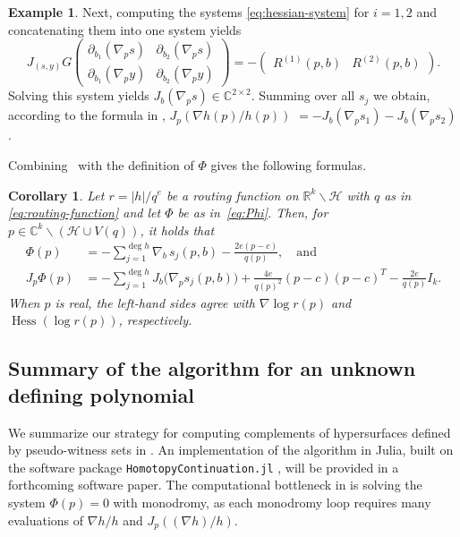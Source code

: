\documentclass[11pt]{article}
\numberwithin{equation}{section}
\theoremstyle{plain}
\newtheorem{corollary}[theorem]{Corollary}
\theoremstyle{definition}
\newtheorem{example}[theorem]{Example}
\theoremstyle{remark}
\newcommand{\sH}{{\mathcal H}}
\newcommand\bC{{\mathbb C}}
\newcommand\bR{{\mathbb R}}
\DeclareMathOperator*{\Hess}{Hess}
\begin{document}
\begin{example}
    Next, computing the systems \eqref{eq:hessian-system} for $i=1,2$ and concatenating them into one system yields
    \begin{equation*}
        J_{(s,y)}G
        \begin{pmatrix}
           \partial_{b_{1}}(\nabla_{p}s) & \partial_{b_{2}}(\nabla_{p}s)\\
           \partial_{b_{1}}(\nabla_{p}y) & \partial_{b_{2}}(\nabla_{p}y)
        \end{pmatrix}
        = -
        \begin{pmatrix}
        R^{(1)}(p,b) & R^{(2)}(p,b)    
        \end{pmatrix}.
    \end{equation*}
    Solving this system yields $J_{b}(\nabla_{p}s) \in \bC^{2\times 2}$.
    Summing over all $s_j$ we obtain, according to the formula in , $J_{p}(\nabla h(p)/h(p))$ $= -J_{b}(\nabla_{p}s_{1}) - J_{b}(\nabla_{p}s_{2})$.\qedhere
\end{example}

Combining~ with the definition of $\Phi$ gives the following formulas.

\begin{corollary}
Let $r = \lvert h\rvert/q^{e}$ be a routing function on $\bR^{k}\smallsetminus \sH$ with $q$ as in \eqref{eq:routing-function} and let $\Phi$ be as in~\eqref{eq:Phi}. Then, for $p \in \bC^{k}\smallsetminus (\sH \cup V(q))$, it holds that
\begin{align*}
\Phi(p) &= -\sum_{j=1}^{\deg h} \nabla_b\, s_{j}(p,b)
- \frac{2e(p-c)}{q(p)},\quad  \text{and}\\
J_{p}\Phi(p)
&= -\sum_{j=1}^{\deg h}J_b\bigl(\nabla_{p} s_{j}(p,b)\bigr) + \frac{4e}{q(p)^{2}}(p-c)(p-c)^{T} - \frac{2e}{q(p)}I_{k}.
\end{align*}
When $p$ is real, the left-hand sides agree with $\nabla\log r(p)$ and $\Hess(\log r(p))$, respectively.
\end{corollary}


\subsection{Summary of the algorithm for an unknown defining polynomial}
\label{subsec:summary}

We summarize our strategy for computing complements of hypersurfaces defined by pseudo-witness sets in . An implementation of the algorithm in Julia, built on the software package \texttt{HomotopyContinuation.jl} \cite{homotopycontinuation}, will be provided in a forthcoming software paper. The computational bottleneck in  is solving the system $\Phi(p) = 0$ with monodromy, as each monodromy loop requires many evaluations of $\nabla h/h$ and $J_{p}((\nabla h)/h)$. 
\end{document}

